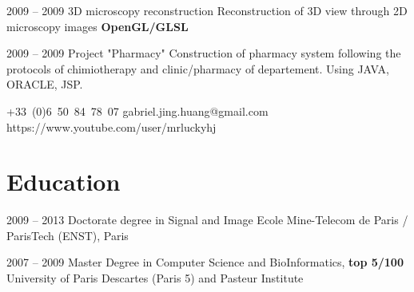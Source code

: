\documentclass{tccv}
\begin{document}
\begin{eventlist}
\item{2009 -- 2009}
     {3D microscopy reconstruction}
     {Reconstruction of 3D view through 2D microscopy images \textbf{OpenGL/GLSL}}

\item{2009 -- 2009}
     {Project "Pharmacy"}
     {Construction of pharmacy system following the protocols of chimiotherapy and clinic/pharmacy of departement.
Using JAVA, ORACLE, JSP.}


\end{eventlist}


%

    {+33~(0)6~50~84~78~07}
    {gabriel.jing.huang@gmail.com}
		{https://www.youtube.com/user/mrluckyhj}

\section{Education}

\begin{yearlist}

\item{2009 -- 2013}
     {Doctorate degree in Signal and Image}
     {Ecole Mine-Telecom de Paris / ParisTech (ENST), Paris}

\item{2007 -- 2009}
     {Master Degree in Computer Science and BioInformatics, \textbf{top 5/100}}
     {University of Paris Descartes (Paris 5) and Pasteur Institute}

\end{yearlist}
\end{document}

